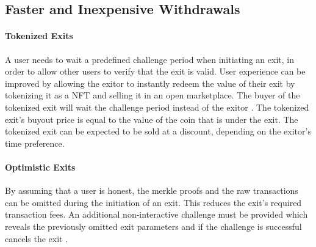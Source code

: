 \subsection{Faster and Inexpensive Withdrawals}

\paragraph{Tokenized Exits} A user needs to wait a predefined challenge period when initiating an exit, in order to allow other users to verify that the exit is valid. User experience can be improved by allowing the exitor to instantly redeem the value of their exit by tokenizing it as a NFT and selling it in an open marketplace. The buyer of the tokenized exit will wait the challenge period instead of the exitor \cite{fast_withdrawals}. The tokenized exit's buyout price is equal to the value of the coin that is under the exit. The tokenized exit can be expected to be sold at a discount, depending on the exitor's time preference.

\paragraph{Optimistic Exits} By assuming that a user is honest, the merkle proofs and the raw transactions can be omitted during the initiation of an exit. This reduces the exit's required transaction fees. An additional non-interactive challenge must be provided which reveals the previously omitted exit parameters and if the challenge is successful cancels the exit \cite{optimistic}.
